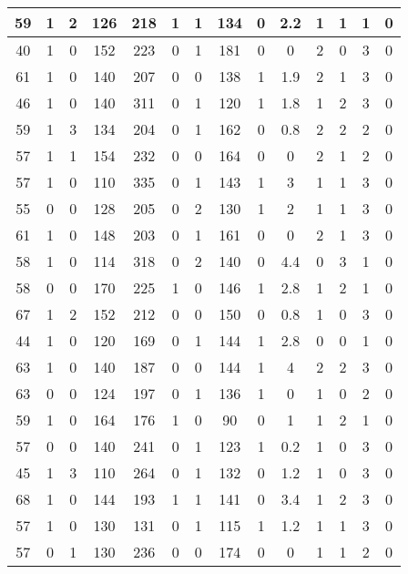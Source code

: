 \documentclass{article}
\begin{document}
\begin{longtable}{|c|c|c|c|c|c|c|c|c|c|c|c|c|c|}
59 & 1 & 2 & 126 & 218 & 1 & 1 & 134 & 0 & 2.2 & 1 & 1 & 1 & 0 \\ \hline
40 & 1 & 0 & 152 & 223 & 0 & 1 & 181 & 0 & 0 & 2 & 0 & 3 & 0 \\ \hline
61 & 1 & 0 & 140 & 207 & 0 & 0 & 138 & 1 & 1.9 & 2 & 1 & 3 & 0 \\ \hline
46 & 1 & 0 & 140 & 311 & 0 & 1 & 120 & 1 & 1.8 & 1 & 2 & 3 & 0 \\ \hline
59 & 1 & 3 & 134 & 204 & 0 & 1 & 162 & 0 & 0.8 & 2 & 2 & 2 & 0 \\ \hline
57 & 1 & 1 & 154 & 232 & 0 & 0 & 164 & 0 & 0 & 2 & 1 & 2 & 0 \\ \hline
57 & 1 & 0 & 110 & 335 & 0 & 1 & 143 & 1 & 3 & 1 & 1 & 3 & 0 \\ \hline
55 & 0 & 0 & 128 & 205 & 0 & 2 & 130 & 1 & 2 & 1 & 1 & 3 & 0 \\ \hline
61 & 1 & 0 & 148 & 203 & 0 & 1 & 161 & 0 & 0 & 2 & 1 & 3 & 0 \\ \hline
58 & 1 & 0 & 114 & 318 & 0 & 2 & 140 & 0 & 4.4 & 0 & 3 & 1 & 0 \\ \hline
58 & 0 & 0 & 170 & 225 & 1 & 0 & 146 & 1 & 2.8 & 1 & 2 & 1 & 0 \\ \hline
67 & 1 & 2 & 152 & 212 & 0 & 0 & 150 & 0 & 0.8 & 1 & 0 & 3 & 0 \\ \hline
44 & 1 & 0 & 120 & 169 & 0 & 1 & 144 & 1 & 2.8 & 0 & 0 & 1 & 0 \\ \hline
63 & 1 & 0 & 140 & 187 & 0 & 0 & 144 & 1 & 4 & 2 & 2 & 3 & 0 \\ \hline
63 & 0 & 0 & 124 & 197 & 0 & 1 & 136 & 1 & 0 & 1 & 0 & 2 & 0 \\ \hline
59 & 1 & 0 & 164 & 176 & 1 & 0 & 90 & 0 & 1 & 1 & 2 & 1 & 0 \\ \hline
57 & 0 & 0 & 140 & 241 & 0 & 1 & 123 & 1 & 0.2 & 1 & 0 & 3 & 0 \\ \hline
45 & 1 & 3 & 110 & 264 & 0 & 1 & 132 & 0 & 1.2 & 1 & 0 & 3 & 0 \\ \hline
68 & 1 & 0 & 144 & 193 & 1 & 1 & 141 & 0 & 3.4 & 1 & 2 & 3 & 0 \\ \hline
57 & 1 & 0 & 130 & 131 & 0 & 1 & 115 & 1 & 1.2 & 1 & 1 & 3 & 0 \\ \hline
57 & 0 & 1 & 130 & 236 & 0 & 0 & 174 & 0 & 0 & 1 & 1 & 2 & 0 \\ \hline
\end{longtable}
\end{document}
